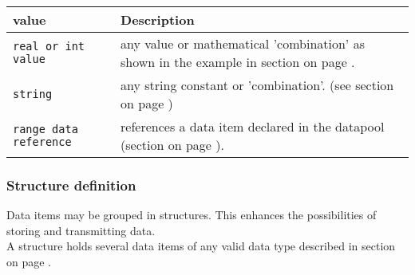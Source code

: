 


\begin{tabularx}{\textwidth}{l|X}
value                    & Description \\
\hline
\verb+real or int value+ & any value or mathematical 'combination' as shown in the example
                           in section \nameref{sec:scale} on page \pageref{sec:scale}. \\
\verb+string+            & any string constant or 'combination'.
                           (see section \nameref{sec:string} on page
                           \pageref{sec:string}) \\
\verb+range data reference+ & references a data item declared in the datapool
                             (section \nameref{sec:rangedatareference} on page
                              \pageref{sec:rangedatareference}). \\
\end{tabularx}
\vspace{0.5cm}



\newpage
\subsubsection{Structure definition}
\label{sec:dpstruct}
Data items may be grouped in structures. This enhances the possibilities
of storing and transmitting data. \\
A structure holds several data items of any valid data type described in
section  on page \pageref{sec:dpitem}.

